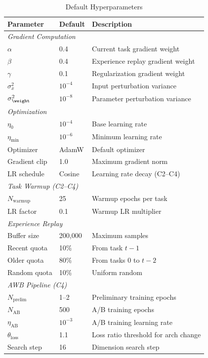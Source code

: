 {\small
\begin{table}[h]
\centering
\caption{Default Hyperparameters}
\label{tab:hyperparameters}
\begin{tabular}{lll}
\hline
\textbf{Parameter} & \textbf{Default} & \textbf{Description} \\
\hline
\multicolumn{3}{l}{\textit{Gradient Computation}} \\
$\alpha$ & 0.4 & Current task gradient weight \\
$\beta$ & 0.4 & Experience replay gradient weight \\
$\gamma$ & 0.1 & Regularization gradient weight \\
$\sigma_x^2$ & $10^{-4}$ & Input perturbation variance \\
$\sigma_{\weight}^2$ & $10^{-8}$ & Parameter perturbation variance \\
\hline
\multicolumn{3}{l}{\textit{Optimization}} \\
$\eta_0$ & $10^{-4}$ & Base learning rate \\
$\eta_{\min}$ & $10^{-6}$ & Minimum learning rate \\
Optimizer & AdamW & Default optimizer \\
Gradient clip & 1.0 & Maximum gradient norm \\
LR schedule & Cosine & Learning rate decay (C2--C4) \\
\hline
\multicolumn{3}{l}{\textit{Task Warmup (C2--C4)}} \\
$N_{\text{warmup}}$ & 25 & Warmup epochs per task \\
LR factor & 0.1 & Warmup LR multiplier \\
\hline
\multicolumn{3}{l}{\textit{Experience Replay}} \\
Buffer size & 200,000 & Maximum samples \\
Recent quota & 10\% & From task $t-1$ \\
Older quota & 80\% & From tasks $0$ to $t-2$ \\
Random quota & 10\% & Uniform random \\
\hline
\multicolumn{3}{l}{\textit{AWB Pipeline (C4)}} \\
$N_{\text{prelim}}$ & 1--2 & Preliminary training epochs \\
$N_{\text{AB}}$ & 500 & A/B training epochs \\
$\eta_{\text{AB}}$ & $10^{-3}$ & A/B training learning rate \\
$\theta_{\text{loss}}$ & 1.1 & Loss ratio threshold for arch change \\
Search step & 16 & Dimension search step \\
\hline
\end{tabular}
\end{table}
}

